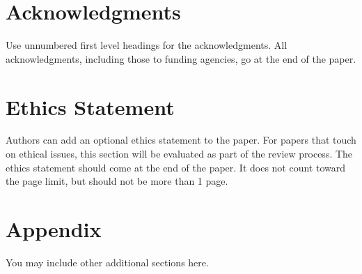 \documentclass{article} %
\begin{document}
\section*{Acknowledgments}
Use unnumbered first level headings for the acknowledgments. All
acknowledgments, including those to funding agencies, go at the end of the paper.

\section*{Ethics Statement}
Authors can add an optional ethics statement to the paper. 
For papers that touch on ethical issues, this section will be evaluated as part of the review process. The ethics statement should come at the end of the paper. It does not count toward the page limit, but should not be more than 1 page. 






\appendix
\section{Appendix}
You may include other additional sections here.
\end{document}

